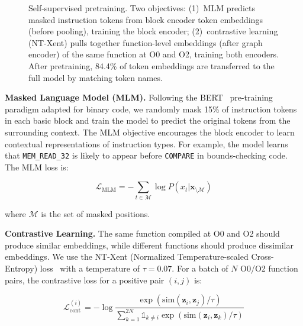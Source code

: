 \documentclass[sigconf,nonacm]{acmart}
\begin{document}
\begin{figure}[t]
{%
    }%
    \caption{Self-supervised pretraining. Two objectives: (1)~MLM predicts masked instruction tokens from block encoder token embeddings (before pooling), training the block encoder; (2)~contrastive learning (NT-Xent) pulls together function-level embeddings (after graph encoder) of the same function at O0 and O2, training both encoders. After pretraining, 84.4\% of token embeddings are transferred to the full model by matching token names.}
    \label{fig:pretraining}
\end{figure}

\textbf{Masked Language Model (MLM).} Following the BERT~\cite{devlin2019bert} pre-training paradigm adapted for binary code, we randomly mask 15\% of instruction tokens in each basic block and train the model to predict the original tokens from the surrounding context. The MLM objective encourages the block encoder to learn contextual representations of instruction types. For example, the model learns that \texttt{MEM\_READ\_32} is likely to appear before \texttt{COMPARE} in bounds-checking code. The MLM loss is:

\begin{equation}
    \mathcal{L}_\text{MLM} = -\sum_{t \in \mathcal{M}} \log P(x_t | \mathbf{x}_{\setminus \mathcal{M}})
\end{equation}

where $\mathcal{M}$ is the set of masked positions.

\textbf{Contrastive Learning.} The same function compiled at O0 and O2 should produce similar embeddings, while different functions should produce dissimilar embeddings. We use the NT-Xent (Normalized Temperature-scaled Cross-Entropy) loss~\cite{simclr} with a temperature of $\tau{=}0.07$. For a batch of $N$ O0/O2 function pairs, the contrastive loss for a positive pair $(i, j)$ is:

\begin{equation}
    \mathcal{L}_\text{cont}^{(i)} = -\log \frac{\exp(\text{sim}(\mathbf{z}_i, \mathbf{z}_j) / \tau)}{\sum_{k=1}^{2N} \mathbb{1}_{k \neq i} \exp(\text{sim}(\mathbf{z}_i, \mathbf{z}_k) / \tau)}
\end{equation}
\end{document}
